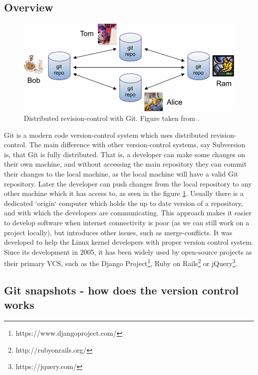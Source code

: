 \documentclass[12pt,twoside,notitlepage]{report}
\begin{document}
\subsection{Overview}
\begin{figure}[ht!]
\includegraphics[width=1.0\textwidth]{decentralised_git.png}
\caption[Distributed revision-control with Git]{Distributed revision-control with Git. Figure taken from \cite{TorvaldsGit}.}
\label{decentralised_git}
\end{figure}
Git\cite{TorvaldsGit} is a modern code version-control system which uses distributed revision-control. The main difference with other version-control systems, say Subversion is, that Git is fully distributed. That is, a developer can make some changes on their own machine, and without accessing the main repository they can commit their changes to the local machine, as the local machine will have a valid Git repository. Later the developer can push changes from the local repository to any other machine which it has access to, as seen in the figure \ref{decentralised_git}. Usually there is a dedicated `origin` computer which holds the up to date version of a repository, and with which the developers are communicating. This approach makes it easier to develop software when internet connectivity is poor (as we can still work on a project locally), but introduces other issues, such as merge-conflicts. It was developed to help the Linux kernel developers with proper version control system. Since its development in 2005, it has been widely used by open-source projects as their primary VCS, such as the Django Project\footnote{https://www.djangoproject.com/}, Ruby on Rails\footnote{http://rubyonrails.org/} or jQuery\footnote{https://jquery.com/}.
\subsection{Git snapshots - how does the version control works}
\end{document}
